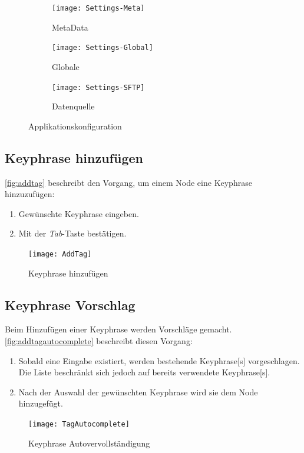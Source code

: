 \newpage
\begin{landscape}

\begin{figure}[htbp]
    \centering
    \begin{subfigure}[b]{0.5\textwidth}
    \texttt{[image: Settings-Meta]}
    \caption{MetaData}
    \label{fig:meta-config}
    \end{subfigure}
     \begin{subfigure}[b]{0.3\textwidth}
    \texttt{[image: Settings-Global]}
    \caption{Globale}
    \label{fig:global-config}
    \end{subfigure}
     \begin{subfigure}[b]{0.5\textwidth}
    \texttt{[image: Settings-SFTP]}
    \caption{Datenquelle}
    \label{fig:sftp-config}
    \end{subfigure}
    \caption{Applikationskonfiguration}
\end{figure}
\end{landscape}
\newpage

\subsection{Keyphrase hinzufügen}
\autoref{fig:addtag} beschreibt den Vorgang, um einem Node eine \gls{Keyphrase} hinzuzufügen:
\begin{enumerate}
    \item Gewünschte \gls{Keyphrase} eingeben. 
    \item Mit der \textit{Tab}-Taste bestätigen.
\end{enumerate}

\begin{figure}[ht]
\centering
\texttt{[image: AddTag]}
\caption{Keyphrase hinzufügen}
\label{fig:addtag}
\end{figure}


\subsection{Keyphrase Vorschlag}
Beim Hinzufügen einer \gls{Keyphrase} werden Vorschläge gemacht. \autoref{fig:addtagautocomplete} beschreibt diesen Vorgang:
\begin{enumerate}
    \item Sobald eine Eingabe existiert, werden bestehende \gls{Keyphrase}[s] vorgeschlagen. Die Liste beschränkt sich jedoch auf bereits verwendete \gls{Keyphrase}[s].
    \item Nach der Auswahl der gewünschten \gls{Keyphrase} wird sie dem Node hinzugefügt.
\end{enumerate}
\begin{figure}[ht]
\centering
\texttt{[image: TagAutocomplete]}
\caption{Keyphrase Autovervollständigung}
\label{fig:addtagautocomplete}
\end{figure}


